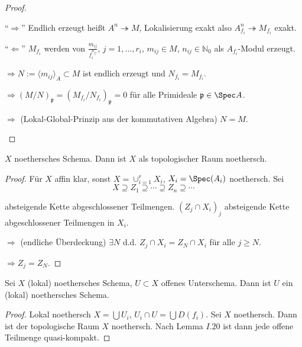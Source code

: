 \begin{proof}
  \mbox{}
  \begin{casenv}
  \item[``$\Rightarrow$'' ] Endlich erzeugt heißt $A^{n}\twoheadrightarrow M$, Lokalisierung
    exakt also $A_{f_{i}}^{n}\twoheadrightarrow M_{f_{i}}$ exakt.
  \item[``$\Leftarrow$''] $M_{f_{i}}$ werden von $\frac{m_{ij}}{f_{i}^{n_{ij}}}$, $j=1,\ldots,r_{i}$,
    $m_{ij}\in M$, $n_{ij}\in\mathbb{N}_{0}$ als $A_{f_{i}}$-Modul
    erzeugt.

    $\Rightarrow N:=\langle m_{ij}\rangle_{A}\subset M$ ist endlich erzeugt
    und $N_{f_{i}}=M_{f_{i}}$.

    $\Rightarrow(M/N)_{\mathfrak{p}}=(M_{f_{i}}/N_{f_{i}})_{\mathfrak{p}}=0$
    für alle Primideale $\mathfrak{p}\in\Spec A$.

    $\Rightarrow$ (Lokal-Global-Prinzip aus der kommutativen Algebra)
    $N=M$.

  \end{casenv}
\end{proof}
\begin{rem*}
  $X$ noethersches Schema. Dann ist $X$ als topologischer Raum noethersch.
\end{rem*}
\begin{proof}
  Für $X$ affin klar, sonst $X=\cup_{i=1}^{r}X_{i}$, $X_{i}=\Spec(A_{i})$
  noethersch. Sei
  \[
    X\supseteq Z_{1}\supseteq\cdots\supseteq Z_{n}\supseteq\cdots
  \]

  absteigende Kette abgeschlossener Teilmengen. $(Z_{j}\cap X_{i})_{j}$
  absteigende Kette abgeschlossener Teilmengen in $X_{i}$.

  $\Longrightarrow$ (endliche Überdeckung) $\exists N$ d.d. $Z_{j}\cap X_{i}=Z_{N}\cap X_{i}$
  für alle $j\geq N$.

  $\Longrightarrow Z_{j}=Z_{N}$.
\end{proof}
\begin{cor}[17]
  Sei $X$ (lokal) noethersches Schema, $U\subset X$ offenes Unterschema.
  Dann ist $U$ ein (lokal) noethersches Schema.
\end{cor}

\begin{proof}
  Lokal noethersch $X=\bigcup U_{i}$, $U_{i}\cap U=\bigcup D(f_{i})$.
  Sei $X$ noethersch. Dann ist der topologische Raum $X$ noethersch.
  Nach Lemma $I.20$ ist dann jede offene Teilmenge quasi-kompakt.
\end{proof}

